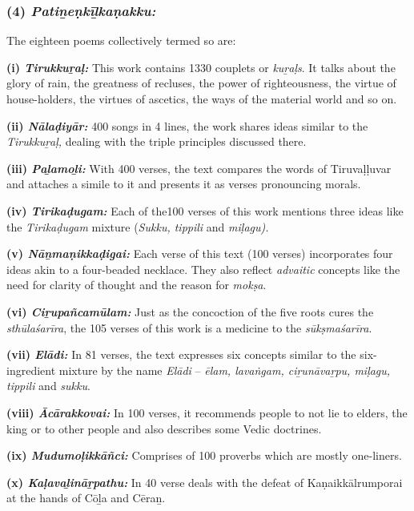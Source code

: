\subsubsection*{(4) \textit{Patiṉeṇkīḻkaṇakku:}}

\vskip -7pt

The eighteen poems collectively termed so are:

\textbf{(i) \textit{Tirukkuṟaḷ:}} This work contains 1330 couplets or \textit{kuṟaḷs}. It talks about the glory of rain, the greatness of recluses, the power of righteousness, the virtue of house-holders, the virtues of ascetics, the ways of the material world and so on.

\textbf{(ii) \textit{Nālaḍiyār:}} 400 songs in 4 lines, the work shares ideas similar to the \textit{Tirukkuṟaḷ,} dealing with the triple principles discussed there.

\textbf{(iii) \textit{Paḻamoḻi:}} With 400 verses, the text compares the words of Tiruvaḷḷuvar and attaches a simile to it and presents it as verses pronouncing morals.

\textbf{(iv) \textit{Tirikaḍugam:}} Each of the100 verses of this work mentions three ideas like the \textit{Tirikaḍugam} mixture (\textit{Sukku, tippili} and \textit{miḷagu).}

\textbf{(v) \textit{Nāṉmaṇikkaḍigai:}} Each verse of this text (100 verses) incorporates four ideas akin to a four-beaded necklace. They also reflect \textit{advaitic} concepts like the need for clarity of thought and the reason for \textit{mokṣa}.

\textbf{(vi) \textit{Ciṟupañcamūlam:}} Just as the concoction of the five roots cures the \textit{sthūlaśarīra}, the 105 verses of this work is a medicine to the \textit{sūkṣmaśarīra}.

\textbf{(vii) \textit{Elādi:}} In 81 verses, the text expresses six concepts similar to the six-ingredient mixture by the name \textit{Elādi} – \textit{ēlam, lavaṅgam, ciṟunāvaṟpu, miḷagu, tippili} and \textit{sukku}.

\textbf{(viii) \textit{Ācārakkovai:}} In 100 verses, it recommends people to not lie to elders, the king or to other people and also describes some Vedic doctrines.

\textbf{(ix) \textit{Mudumoḷikkāñci:}} Comprises of 100 proverbs which are mostly one-liners.

\textbf{(x) \textit{Kaḷavaḻināṟpathu:}} In 40 verse deals with the defeat of Kaṇaikkālrumporai at the hands of Cōḻa and Cēraṉ.

